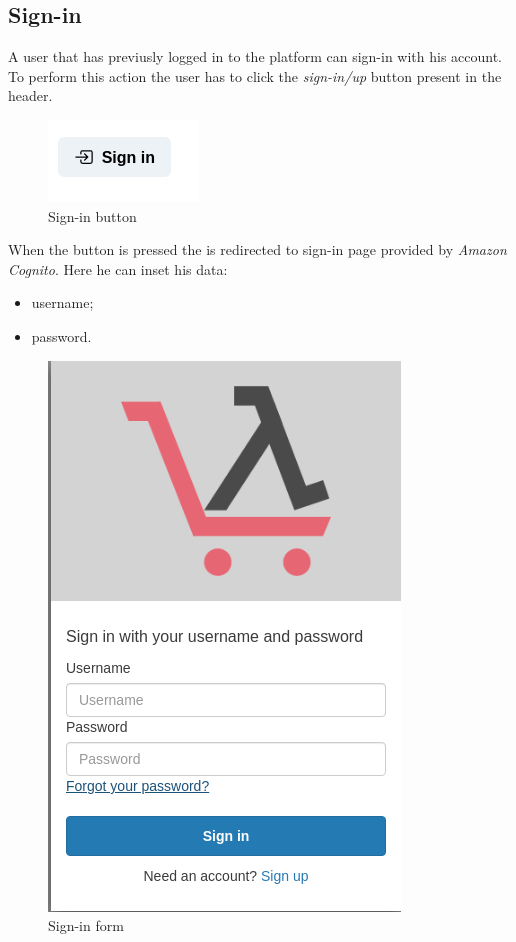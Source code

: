 \subsection{Sign-in}
A user that has previusly logged in to the platform can sign-in with his account. To perform this action the user has to click the \textit{sign-in/up} button present in the header.
\begin{figure}[!ht]
    \caption{Sign-in button}
    \vspace{10px}
    \includegraphics[scale=0.5]{../../../../Images/userManual/signInButton.png}
    \centering
\end{figure}
When the button is pressed the is redirected to sign-in page provided by \textit{Amazon Cognito}. Here he can inset his data:
\begin{itemize}
    \item username;
    \item password.
\end{itemize}
\begin{figure}[!ht]
    \caption{Sign-in form}
    \vspace{10px}
    \includegraphics[scale=0.3]{../../../../Images/userManual/singIN.png}
    \centering
\end{figure}

